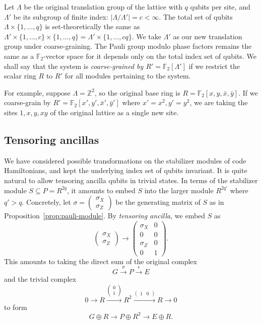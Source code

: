 \documentclass[letterpaper,12pt]{amsart}
\theoremstyle{definition} \newtheorem{defn}{Definition}
\theoremstyle{definition} \newtheorem{rem}{Remark}
\theoremstyle{definition} \newtheorem{example}{Example}
\newcommand{\FF}{\mathbb{F}}
\begin{document}
Let $\Lambda$ be the original translation group of the lattice with $q$ qubits per site,
and $\Lambda'$ be its subgroup of finite index: $|\Lambda/\Lambda'| = c < \infty$.
The total set of qubits $\Lambda \times \{1,\ldots,q\}$ is set-theoretically the same as
$\Lambda' \times \{ 1, \ldots, c \} \times \{1,\ldots,q\} = \Lambda' \times \{ 1, \ldots, cq\}$.
We take $\Lambda'$ as our new translation group under coarse-graining.
The Pauli group modulo phase factors remains the same as a $\FF_2$-vector space
for it depends only on the total index set of qubits.
We shall say that the system is {\em coarse-grained by $R'=\FF_2[\Lambda']$}
if we restrict the scalar ring $R$ to $R'$ for all modules pertaining to the system.

For example, suppose $\Lambda = \mathbb{Z}^2$,
so the original base ring is $R = \FF_2[x,y,\bar x,\bar y]$.
If we coarse-grain by $R' = \FF_2[x',y', \bar x', \bar y']$ where $x' = x^2, y' = y^2$,
we are taking the sites $1,x,y,xy$ of the original lattice as a single new site.


\subsection{Tensoring ancillas}
We have considered possible transformations
on the stabilizer modules of code Hamiltonians,
and kept the underlying index set of qubits invariant.
It is quite natural to allow tensoring ancilla qubits in trivial states.
In terms of the stabilizer module $S \subseteq P=R^{2q}$,
it amounts to embed $S$ into the larger module $R^{2q'}$ where $q' > q$.
Concretely,
let $\sigma = \begin{pmatrix} \sigma_X \\ \sigma_Z \end{pmatrix}$
be the generating matrix of $S$ as in Proposition~\ref{prop:pauli-module}.
By {\em tensoring ancilla}, we embed $S$ as
\[
\begin{pmatrix} \sigma_X \\ \sigma_Z \end{pmatrix}
 \to 
\begin{pmatrix}
 \sigma_X & 0 \\
 0        & 0 \\
 \sigma_Z & 0 \\
 0        & 1
\end{pmatrix} .
\]
This amounts to taking the direct sum of the original complex
\[
 G \xrightarrow{\sigma} P \xrightarrow{\epsilon} E
\]
and the trivial complex
\[
0
\to
 R
 \xrightarrow{ \begin{pmatrix} 0 \\ 1 \end{pmatrix} }
 R^2
 \xrightarrow{ \begin{pmatrix} 1 & 0 \end{pmatrix} }
 R
\to 0
\]
to form
\[
  G \oplus R \xrightarrow{} P \oplus R^2 \xrightarrow{} E \oplus R .
\]
\end{document}
